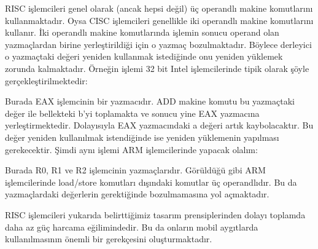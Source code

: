 \documentclass[letterpaper,10pt,turkish]{sphinxmanual}
\begin{document}
\begin{description}
\sphinxAtStartPar
RISC işlemcileri genel olarak (ancak hepsi değil) üç operandlı makine komutlarını kullanmaktadır.
Oysa CISC işlemcileri genellikle iki operandlı makine komutlarını kullanır. İki operandlı
makine komutlarında işlemin sonucu operand olan yazmaçlardan birine yerleştirildiği için o
yazmaç bozulmaktadır. Böylece derleyici o yazmaçtaki değeri yeniden kullanmak istediğinde
onu yeniden yüklemek zorunda kalmaktadır. Örneğin  işlemi 32 bit Intel
işlemcilerinde tipik olarak şöyle gerçekleştirilmektedir:

\begin{sphinxVerbatim}[commandchars=\\\{\}]
  
  
 
\end{sphinxVerbatim}

\sphinxAtStartPar
Burada EAX işlemcinin bir yazmacıdır. ADD makine komutu bu yazmaçtaki değer ile bellekteki
b’yi toplamakta ve sonucu yine EAX yazmacına yerleştirmektedir. Dolayısıyla EAX yazmacındaki
a değeri artık kaybolacaktır. Bu değer yeniden kullanılmak istendiğinde ise yeniden yüklemenin
yapılması gerekecektir. Şimdi aynı işlemi ARM işlemcilerinde yapacak olalım:

\begin{sphinxVerbatim}[commandchars=\\\{\}]
  
  
   
  
\end{sphinxVerbatim}

\sphinxAtStartPar
Burada R0, R1 ve R2 işlemcinin yazmaçlarıdır. Görüldüğü gibi ARM işlemcilerinde load/store
komutları dışındaki komutlar üç operandlıdır. Bu da yazmaçlardaki değerlerin gerektiğinde
bozulmamasına yol açmaktadır.

\sphinxAtStartPar
RISC işlemcileri yukarıda belirttiğimiz tasarım prensiplerinden dolayı toplamda daha az güç
harcama eğilimindedir. Bu da onların mobil aygıtlarda kullanılmasının önemli bir gerekçesini
oluşturmaktadır.


\end{description}
\end{document}
